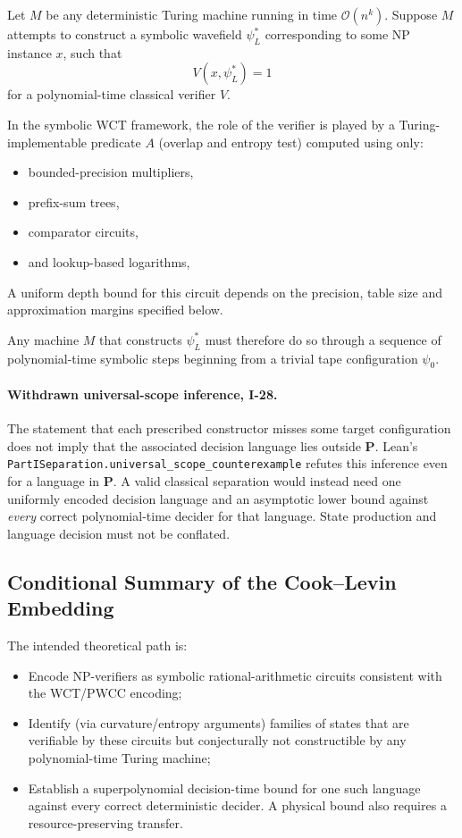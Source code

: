 \documentclass[12pt]{article}
\theoremstyle{remark}
\begin{document}
Let \(M\) be any deterministic Turing machine running in time \(\mathcal{O}(n^k)\).  
Suppose \(M\) attempts to construct a symbolic wavefield \(\psi^*_L\) corresponding
to some NP instance \(x\), such that
\[
V(x, \psi^*_L) = 1
\]
for a polynomial-time classical verifier \(V\).

In the symbolic WCT framework, the role of the verifier is played by a Turing-implementable
predicate \(A\) (overlap and entropy test) computed using only:
\begin{itemize}
    \item bounded-precision multipliers,
    \item prefix-sum trees,
    \item comparator circuits,
    \item and lookup-based logarithms,
\end{itemize}
A uniform depth bound for this circuit depends on the precision, table size
and approximation margins specified below.  

Any machine \(M\) that constructs \(\psi^*_L\) must therefore do so through a sequence of
polynomial-time symbolic steps beginning from a trivial tape configuration \(\psi_0\).

\paragraph{Withdrawn universal-scope inference, I-28.}
The statement that each prescribed constructor misses some
target configuration does not imply that the associated
decision language lies outside $\mathbf P$.  Lean's
\nolinkurl{PartISeparation.universal_scope_counterexample}
refutes this inference even for a language in $\mathbf P$.
A valid classical separation would instead need one
uniformly encoded decision language and an asymptotic
lower bound against \emph{every} correct polynomial-time
decider for that language.  State production and
language decision must not be conflated.

\subsection{Conditional Summary of the Cook--Levin Embedding}

The intended theoretical path is:

\begin{itemize}
  \item Encode NP-verifiers as symbolic rational-arithmetic circuits consistent with
        the WCT/PWCC encoding;
  \item Identify (via curvature/entropy arguments) families of states that are
        verifiable by these circuits but conjecturally not constructible by any
        polynomial-time Turing machine;
  \item Establish a superpolynomial decision-time bound for one such
        language against every correct deterministic decider. A physical
        bound also requires a resource-preserving transfer.
\end{itemize}
\end{document}
